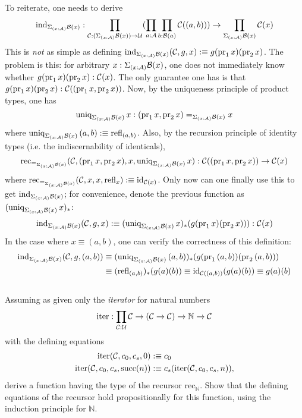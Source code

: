 To reiterate, one needs to derive
\[
	\text{ind}_{\Sigma_{(x : \mathcal{A})}\mathcal{B}(x)} : \prod_{\mathcal{C} : (\Sigma_{(x : \mathcal{A})}\mathcal{B}(x)) \to \mathcal{U}}(\prod_{a : \mathcal{A}}\prod_{b : \mathcal{B}(a)}\mathcal{C}((a,b))) \to \prod_{\Sigma_{(x : \mathcal{A})}\mathcal{B}(x)}\mathcal{C}(x)
\]
This is \textit{not} as simple as defining $\text{ind}_{\Sigma_{(x : \mathcal{A})}\mathcal{B}(x)}(\mathcal{C},g,x) :\equiv g(\text{pr}_1\,x)(\text{pr}_2\,x)$. The problem is this: for arbitrary $x : \Sigma_{(x : \mathcal{A})}\mathcal{B}(x)$, one does not immediately know whether $g(\text{pr}_1\,x)(\text{pr}_2\,x) : \mathcal{C}(x)$. The only guarantee one has is that $g(\text{pr}_1\,x)(\text{pr}_2\,x) : \mathcal{C}((\text{pr}_1\,x,\text{pr}_2\,x))$. Now, by the uniqueness principle of product types, one has
\[
	\text{uniq}_{\Sigma_{(x : \mathcal{A})}\mathcal{B}(x)}\,x : (\text{pr}_1\,x,\text{pr}_2\,x) =_{\Sigma_{(x : \mathcal{A})}\mathcal{B}(x)} x
\]
where $\text{uniq}_{\Sigma_{(x : \mathcal{A})}\mathcal{B}(x)}\,(a,b) :\equiv \text{refl}_{(a,b)}$. Also, by the recursion principle of identity types (i.e. the indiscernability of identicals),
\[
	\text{rec}_{=_{\Sigma_{(x : \mathcal{A})}\mathcal{B}(x)}}(\mathcal{C}, (\text{pr}_1\,x,\text{pr}_2\,x), x, \text{uniq}_{\Sigma_{(x : \mathcal{A})}\mathcal{B}(x)}\,x) : \mathcal{C}((\text{pr}_1\,x,\text{pr}_2\,x)) \to \mathcal{C}(x)
\]
where $\text{rec}_{=_{\Sigma_{(x : \mathcal{A})}\mathcal{B}(x)}}(\mathcal{C},x,x,\text{refl}_x) :\equiv \text{id}_{\mathcal{C}(x)}$. Only now can one finally use this to get $\text{ind}_{\Sigma_{(x : \mathcal{A})}\mathcal{B}(x)}$; for convenience, denote the previous function as $(\text{uniq}_{\Sigma_{(x : \mathcal{A})}\mathcal{B}(x)}\,x)_*$:
\[
\text{ind}_{\Sigma_{(x : \mathcal{A})}\mathcal{B}(x)}(\mathcal{C},g,x) :\equiv (\text{uniq}_{\Sigma_{(x : \mathcal{A})}\mathcal{B}(x)}\,x)_*(g(\text{pr}_1\,x)(\text{pr}_2\,x))) : \mathcal{C}(x)
\]
In the case where $x \equiv (a,b)$, one can verify the correctness of this definition:
\begin{align*}
	\text{ind}_{\Sigma_{(x : \mathcal{A})}\mathcal{B}(x)}(\mathcal{C},g,(a,b)) &\equiv (\text{uniq}_{\Sigma_{(x : \mathcal{A})}\mathcal{B}(x)}\,(a,b))_*(g(\text{pr}_1\,(a,b))(\text{pr}_2\,(a,b)))\\
	&\equiv  (\text{refl}_{(a,b)})_*(g(a)(b)) \equiv  \text{id}_{\mathcal{C}((a,b))}(g(a)(b)) \equiv  g(a)(b)
\end{align*} \\



 Assuming as given only the \textit{iterator} for natural numbers
\[
	\text{iter} : \prod_{\mathcal{C}:\mathcal{U}} \mathcal{C} \to (\mathcal{C} \to \mathcal{C}) \to \mathbb{N} \to \mathcal{C}
\]
with the defining equations
\begin{align*}
	\text{iter}(\mathcal{C}, c_{0}, c_{s}, 0) &:\equiv c_{0} \\
	\text{iter}(\mathcal{C}, c_{0}, c_{s}, \text{succ}(n)) &:\equiv c_{s}(\text{iter}(\mathcal{C}, c_{0}, c_{s}, n)),
\end{align*}
derive a function having the type of the recursor $\text{rec}_{\mathbb{N}}$. Show that the defining equations of the recursor hold propositionally for this function, using the induction principle for $\mathbb{N}$. \\


